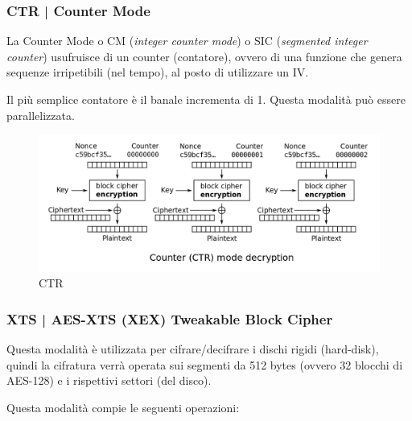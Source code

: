 \subsubsection{CTR | Counter Mode}

 

\textsf{\small La Counter Mode o CM (\emph{integer counter mode}) o SIC (\emph{segmented integer counter}) usufruisce di un counter (contatore), ovvero di una funzione che genera sequenze irripetibili (nel tempo), al posto di utilizzare un IV.}

\textsf{\small Il più semplice contatore è il banale incrementa di 1.}
\textsf{\small Questa modalità può essere parallelizzata.}

\begin{figure}[H]
	\centering
	\includegraphics[width=1\textwidth, height=1\textheight, keepaspectratio]{./images/aes_modes/ctr.png}
	\caption{CTR}
	\label{fig:ctr}
\end{figure}

\subsubsection{XTS | AES-XTS (XEX) Tweakable Block Cipher}

 

\textsf{\small Questa modalità è utilizzata per cifrare/decifrare i dischi rigidi (hard-disk), quindi la cifratura verrà operata sui segmenti da 512 bytes (ovvero 32 blocchi di AES-128) e i rispettivi settori (del disco).}


\textsf{\small Questa modalità compie le seguenti operazioni: } %

 

